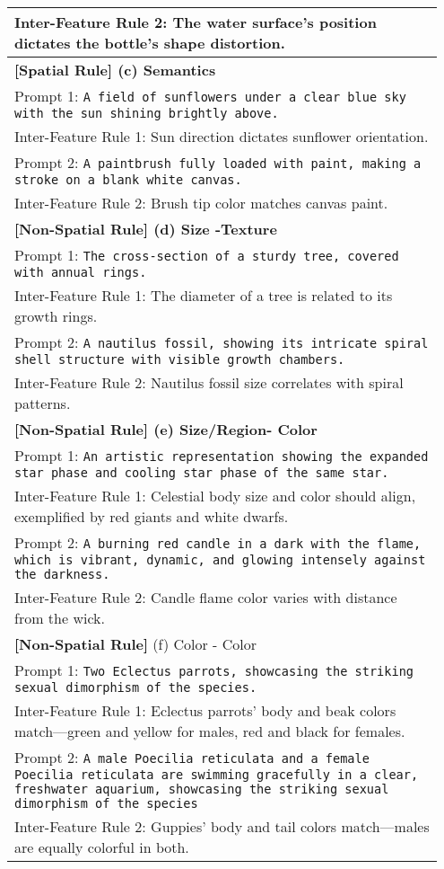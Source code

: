 \begin{table}[]
\begin{tabular}{m{0.95\linewidth}}
        Inter-Feature Rule 2: {The water surface's position dictates the bottle's shape distortion.}\\
		\midrule
		\textbf{[Spatial Rule] (c) Semantics}\\
		Prompt 1: \texttt{A field of sunflowers under a clear blue sky with the sun shining brightly above.} \\
        Inter-Feature Rule 1: {Sun direction dictates sunflower orientation.}\\
        Prompt 2: \texttt{A paintbrush fully loaded with paint, making a stroke on a blank white canvas.} \\
        Inter-Feature Rule 2: {Brush tip color matches canvas paint.}\\
  \midrule
  \textbf{[Non-Spatial Rule] (d) Size -Texture} \\
  	Prompt 1: \texttt{The cross-section of a sturdy tree, covered with annual rings.} \\
        Inter-Feature Rule 1: {The diameter of a tree is related to its growth rings.}\\
        Prompt 2: \texttt{A nautilus fossil, showing its intricate spiral shell structure with visible growth chambers.} \\
        Inter-Feature Rule 2: {Nautilus fossil size correlates with spiral patterns.}\\
    \midrule
    \textbf{[Non-Spatial Rule] (e) Size/Region- Color} \\
  	Prompt 1: \texttt{An artistic representation showing the expanded star phase and cooling star  phase of the same star.} \\
        Inter-Feature Rule 1: {Celestial body size and color should align, exemplified by red giants and white dwarfs.}\\
        Prompt 2: \texttt{A burning red candle in a dark with the flame, which is vibrant, dynamic, and glowing intensely against the darkness.} \\
        Inter-Feature Rule 2: {Candle flame color varies with distance from the wick.}\\
    \midrule
  \textbf{[Non-Spatial Rule] } (f) Color - Color\\
 	Prompt 1: \texttt{Two Eclectus parrots, showcasing the striking sexual dimorphism of the species.} \\
        Inter-Feature Rule 1: {Eclectus parrots' body and beak colors match—green and yellow for males, red and black for females.}\\
        Prompt 2: \texttt{A male Poecilia reticulata and a female Poecilia reticulata are swimming gracefully in a clear, freshwater aquarium, showcasing the striking sexual dimorphism of the species} \\
        Inter-Feature Rule 2: {Guppies' body and tail colors match—males are equally colorful in both.}\\
		\bottomrule
	\end{tabular}%
\end{table}%

